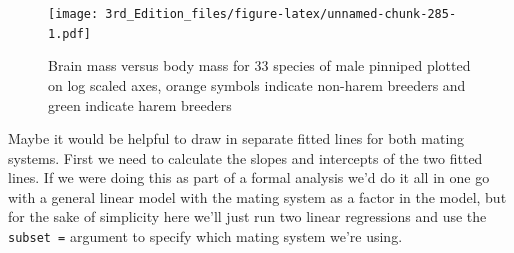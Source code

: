 \documentclass[
]{book}
\newenvironment{Shaded}{\begin{snugshade}}{\end{snugshade}}
\newcommand{\DataTypeTok}[1]{\textcolor[rgb]{0.13,0.29,0.53}{#1}}
\newcommand{\DecValTok}[1]{\textcolor[rgb]{0.00,0.00,0.81}{#1}}
\newcommand{\KeywordTok}[1]{\textcolor[rgb]{0.13,0.29,0.53}{\textbf{#1}}}
\newcommand{\NormalTok}[1]{#1}
\newcommand{\OperatorTok}[1]{\textcolor[rgb]{0.81,0.36,0.00}{\textbf{#1}}}
\newcommand{\StringTok}[1]{\textcolor[rgb]{0.31,0.60,0.02}{#1}}
\begin{document}
\begin{Shaded}
\end{Shaded}

\begin{figure}
\centering
\texttt{[image: 3rd\_Edition\_files/figure-latex/unnamed-chunk-285-1.pdf]}
\caption{\label{fig:unnamed-chunk-285}Brain mass versus body mass for 33 species of male pinniped plotted on log scaled axes, orange symbols indicate non-harem breeders and green indicate harem breeders}
\end{figure}

Maybe it would be helpful to draw in separate fitted lines for both mating systems. First we need to calculate the slopes and intercepts of the two fitted lines. If we were doing this as part of a formal analysis we'd do it all in one go with a general linear model with the mating system as a factor in the model, but for the sake of simplicity here we'll just run two linear regressions and use the \texttt{subset\ =} argument to specify which mating system we're using.
\end{document}
